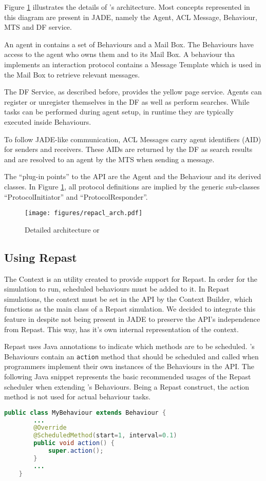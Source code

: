 Figure \ref{fig:arch} illustrates the details of \apiname{}'s architecture. Most concepts represented in this diagram are present in JADE, namely the Agent, ACL Message, Behaviour, MTS and DF service.

An agent in \apiname{} contains a set of Behaviours and a Mail Box. The Behaviours have access to the agent who owns them and to its Mail Box. A behaviour tha implements an interaction protocol contains a Message Template which is used in the Mail Box to retrieve relevant messages.

The DF Service, as described before, provides the yellow page service. Agents can register or unregister themselves in the DF as well as perform searches. While tasks can be performed during agent setup, in runtime they are typically executed inside Behaviours.

To follow JADE-like communication, ACL Messages carry agent identifiers (AID) for senders and receivers. These AIDs are returned by the DF as search results and are resolved to an agent by the MTS when sending a message.

The ``plug-in points'' to the API are the Agent and the Behaviour and its derived classes. In Figure \ref{fig:arch}, all protocol definitions are implied by the generic sub-classes ``ProtocolInitiator'' and ``ProtocolResponder''.

\begin{figure}
	\centering
	\texttt{[image: figures/repacl\_arch.pdf]}
	\caption{Detailed architecture or \apiname{}}
	\label{fig:arch}
\end{figure}

\subsection{Using Repast}

The Context is an utility created to provide support for Repast. In order for the simulation to run, scheduled behaviours must be added to it. In Repast simulations, the context must be set in the API by the Context Builder, which functions as the main class of a Repast simulation. We decided to integrate this feature in \apiname{} despite not being present in JADE to preserve the API's independence from Repast. This way, \apiname{} has it's own internal representation of the context.

Repast uses Java annotations to indicate which methods are to be scheduled. \apiname{}'s Behaviours contain an \texttt{action} method that should be scheduled and called when programmers implement their own instances of the Behaviours in the API. The following Java snippet represents the basic recommended usages of the Repast scheduler when extending \apiname{}'s Behaviours. Being a Repast construct, the action method is not used for actual behaviour tasks.

\begin{lstlisting}[language=Java]
	public class MyBehaviour extends Behaviour {
		...
		@Override
		@ScheduledMethod(start=1, interval=0.1)
		public void action() {
			super.action();
		}
		...
	}
\end{lstlisting}


